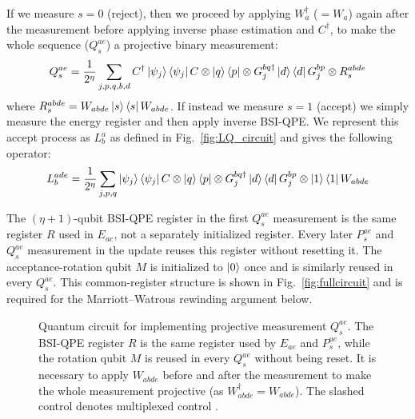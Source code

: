 \documentclass[aps,floatfix,10pt,amssymb,amsfont,amsmath,superscriptaddress,float,nofootinbib,longbibliography,nobalancelastpage,twocolumn]{revtex4-2}
\begin{document}
If we measure $s=0$ (reject), then we proceed by applying $W_{a}^{\dagger}$ ($=W_a$) again after the measurement before applying inverse phase estimation and $C^{\dagger}$, to make the whole sequence ($Q_s^{ae}$) a projective binary measurement:
\begin{equation} 
    Q_s^{ae} = \frac{1}{2^{\eta}}\sum_{j,p,q,b,d}  C^{\dagger}\ket{\psi_j}\bra{\psi_j}C \otimes \ket{q}\bra{p} \otimes G_j^{bq\dagger}\ket{d}\bra{d}G_j^{bp}\otimes R^{abde}_s
\end{equation}
where $R^{abde}_s = W_{abde}\ket{s}\bra{s}W_{abde}$. If instead we measure $s=1$ (accept) we simply measure the energy register and then apply inverse BSI-QPE. We represent this accept process as $L^a_b$ as defined in Fig.~\ref{fig:LQ_circuit} and gives the following operator:
\begin{equation}
    L^{ade}_b = \frac{1}{2^{\eta}}\sum_{j,p,q}\ket{\psi_j}\bra{\psi_j}C \otimes \ket{q}\bra{p} \otimes G^{bq\dagger}_j \ket{d}\bra{d}G^{bp}_j \otimes \ket{1}\bra{1}W_{abde}
\end{equation}

The $(\eta+1)$-qubit BSI-QPE register in the first $Q_s^{ae}$ measurement is the same register $R$ used in $E_{ae}$, not a separately initialized register. Every later $P_s^{ae}$ and $Q_s^{ae}$ measurement in the update reuses this register without resetting it. The acceptance-rotation qubit $M$ is initialized to $\ket{0}$ once and is similarly reused in every $Q_s^{ae}$. This common-register structure is shown in Fig.~\ref{fig:fullcircuit} and is required for the Marriott--Watrous rewinding argument below.
\begin{figure}

\caption{Quantum circuit for implementing projective measurement $Q_s^{ae}$. The BSI-QPE register $R$ is the same register used by $E_{ae}$ and $P_s^{ae}$, while the rotation qubit $M$ is reused in every $Q_s^{ae}$ without being reset. It is necessary to apply $W_{abde}$ before and after the measurement to make the whole measurement projective (as $W_{abde}^{\dagger}=W_{abde}$). The slashed control denotes multiplexed control \cite{low2024trading}.}
\label{fig:Qcircuit}
\end{figure}
\end{document}
